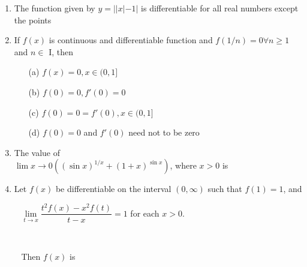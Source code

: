 \begin{enumerate}[label=\arabic*.,ref=\thesubsection.\theenumi]
\item The function given by $y=||x|-1|$ is differentiable for all real numbers except the points
\begin{itemize}
\end{itemize}

\item If $f(x)$ is continuous and differentiable function and $f(1/n)=0 \forall n \geq 1$ and $n \in$ I, then
\begin{itemize}
\item[(a)] $f(x)=0, x\in (0,1]$
\item[(b)] $f(0)=0, f'(0)=0$
\item[(c)] $f(0)=0=f'(0), x \in (0,1]$
\item[(d)] $f(0)=0$ and $f'(0)$ need not to be zero
\end{itemize}

\item The value of \\$\lim\limits{x \to 0}\left((\sin x)^{1/x}+(1+x)^{\sin x}\right)$, where $x>0$ is
\begin{itemize}
\end{itemize}

\item Let $f(x)$ be differentiable on the interval $(0,\infty)$ such that $f(1)=1$, and \\ \item[~]$\lim\limits_{t \to x}\dfrac{t^2f(x)-x^2f(t)}{t-x}=1$ for each $x > 0$.\item[~] \item[~] Then $f(x)$ is
\begin{itemize}
\end{itemize}


\end{enumerate}
